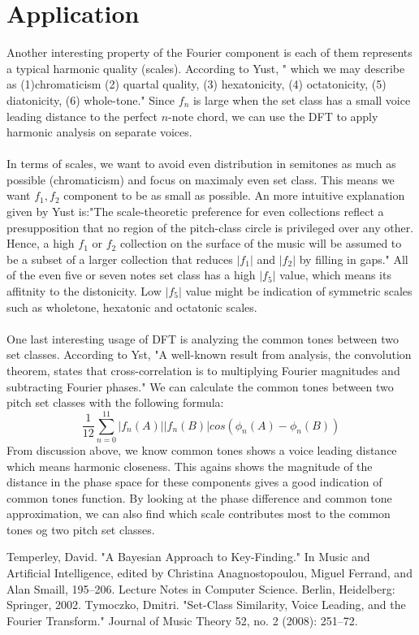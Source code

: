 \documentclass[12pt]{report}
\theoremstyle{definition}
\begin{document}
\section*{Application}
Another interesting property of the Fourier component is each of them 
represents a typical harmonic quality (scales). According to Yust, "
which we may describe as (1)chromaticism (2) quartal quality, 
(3) hexatonicity, (4) octatonicity, (5) diatonicity, (6) whole-tone."
Since $f_n$ is large when the set class has a small voice leading distance 
to the perfect $n$-note chord, we can use the DFT to apply harmonic analysis
on separate voices. 
\\\\
In terms of scales, we want to avoid even distribution in
semitones as much as possible (chromaticism) and focus on maximaly even set class.
This means we want $f_1, f_2$ component to be as small as possible. An 
more intuitive explanation given by Yust is:"The scale-theoretic 
preference for even collections reflect a presupposition that 
no region of the pitch-class circle is privileged over any other. Hence, 
a high $f_1$ or $f_2$ collection on the surface of the music will 
be assumed to be a subset of a larger collection that reduces 
$|f_1|$ and $|f_2|$ by filling in gaps." All of the even five or
seven notes set class has a high $|f_5|$ value, which means its affitnity
to the distonicity. Low $|f_5|$ value might be indication of symmetric scales
such as wholetone, hexatonic and octatonic scales.
\\\\
One last interesting usage of DFT is analyzing the common tones between two set
classes. According to Yst, "A well-known result from analysis, 
the convolution theorem, states that cross-correlation is to 
multiplying Fourier magnitudes and subtracting Fourier phases." 
We can calculate the common tones between two pitch set classes with
the following formula:
\[\frac{1}{12}\sum_{n=0}^{11}|f_n(A)||f_n(B)|cos(\phi_n(A)-\phi_n(B))\]
From discussion above, we know common tones shows a voice leading distance
which means harmonic closeness. This agains shows the magnitude of the 
distance in the phase space for these components gives a good indication
of common tones function. By looking at the phase difference and common
tone approximation, we can also find which scale contributes most to the 
common tones og two pitch set classes.
\begin{thebibliography}{9}

Temperley, David. "A Bayesian Approach to Key-Finding." In Music and Artificial Intelligence, edited by Christina Anagnostopoulou, Miguel Ferrand, and Alan Smaill, 195–206. Lecture Notes in Computer Science. Berlin, Heidelberg: Springer, 2002.
Tymoczko, Dmitri. "Set-Class Similarity, Voice Leading, and the Fourier Transform." Journal of Music Theory 52, no. 2 (2008): 251–72.


\end{thebibliography}
\end{document}
